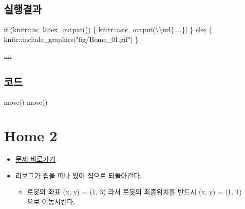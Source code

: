 \documentclass[
  b5paperpaper,
  DIV=11,
  numbers=noendperiod]{scrreprt}
\newenvironment{Shaded}{\begin{snugshade}}{\end{snugshade}}
\newcommand{\ControlFlowTok}[1]{\textcolor[rgb]{0.00,0.23,0.31}{#1}}
\newcommand{\FunctionTok}[1]{\textcolor[rgb]{0.28,0.35,0.67}{#1}}
\newcommand{\NormalTok}[1]{\textcolor[rgb]{0.00,0.23,0.31}{#1}}
\newcommand{\SpecialCharTok}[1]{\textcolor[rgb]{0.37,0.37,0.37}{#1}}
\newcommand{\StringTok}[1]{\textcolor[rgb]{0.13,0.47,0.30}{#1}}
\providecommand{\tightlist}{%
  \setlength{\itemsep}{0pt}\setlength{\parskip}{0pt}}\usepackage{longtable,booktabs,array}
\begin{document}
\hypertarget{uxc2e4uxd589uxacb0uxacfc-1}{%
\subsection{실행결과}\label{uxc2e4uxd589uxacb0uxacfc-1}}

\begin{Shaded}
\begin{Highlighting}[]
\ControlFlowTok{if}\NormalTok{ (knitr}\SpecialCharTok{:::}\FunctionTok{is\_latex\_output}\NormalTok{()) \{}
\NormalTok{  knitr}\SpecialCharTok{::}\FunctionTok{asis\_output}\NormalTok{(}\StringTok{\textquotesingle{}}\SpecialCharTok{\textbackslash{}\textbackslash{}}\StringTok{url\{....\}\textquotesingle{}}\NormalTok{)}
\NormalTok{\} }\ControlFlowTok{else}\NormalTok{ \{}
\NormalTok{  knitr}\SpecialCharTok{::}\FunctionTok{include\_graphics}\NormalTok{(}\StringTok{"fig/Home\_01.gif"}\NormalTok{)}
\NormalTok{\}}
\end{Highlighting}
\end{Shaded}

\url{....}

\hypertarget{uxcf54uxb4dc-1}{%
\subsection{코드}\label{uxcf54uxb4dc-1}}

\begin{Shaded}
\begin{Highlighting}[]
\FunctionTok{move}\NormalTok{()}
\FunctionTok{move}\NormalTok{()}
\end{Highlighting}
\end{Shaded}

\hypertarget{home-02}{%
\section{Home 2}\label{home-02}}

\begin{itemize}
\tightlist
\item
  \href{https://reeborg.ca/reeborg.html?lang=ko-en\&mode=python\&menu=worlds\%2Fmenus\%2Freeborg_intro_en.json\&name=Home\%202\&url=worlds\%2Ftutorial_en\%2Fhome2.json}{문제
  바로가기}
\item
  리보그가 집을 떠나 있어 집으로 되돌아간다.

  \begin{itemize}
  \tightlist
  \item
    로봇의 좌표 (x, y) = (1, 3) 라서 로봇의 최종위치를 반드시 (x, y) =
    (1, 1) 으로 이동시킨다.
  \end{itemize}
\end{itemize}
\end{document}

